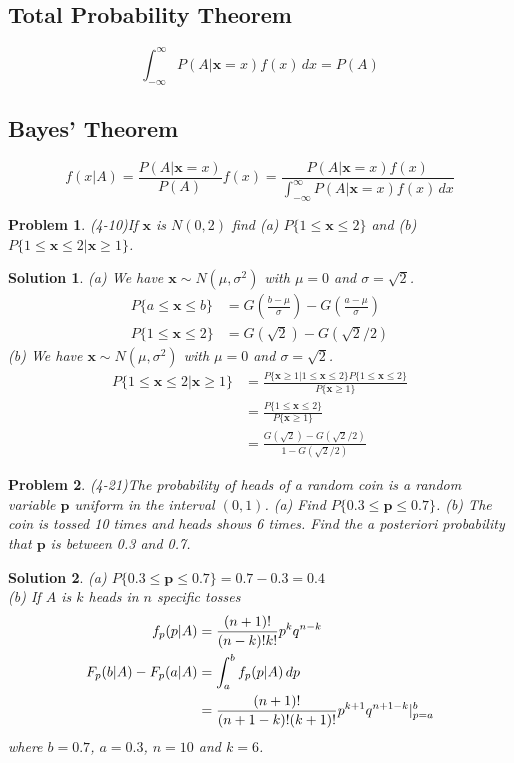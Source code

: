 \documentclass{article}
\newtheorem{problem}{Problem}[section]
\newtheorem{solution}{Solution}[section]
\begin{document}
		\subsection{Total Probability Theorem}
			\begin{equation}
				\int_{-\infty}^{\infty}{P(A|\mathbf{x}=x)f(x)\,dx}=P(A)
			\end{equation}
		\subsection{Bayes' Theorem}
			\begin{equation}
				f(x|A)=\frac{P(A|\mathbf{x}=x)}{P(A)}f(x)=\frac{P(A|\mathbf{x}=x)f(x)}{\int_{-\infty}^{\infty}{P(A|\mathbf{x}=x)f(x)\,dx}}
			\end{equation}
			\begin{problem}
				(4-10)If $\mathbf{x}$ is $N(0,2)$ find (a) $P\{1\leq\mathbf{x}\leq 2\}$ and (b) $P\{1\leq\mathbf{x}\leq 2|\mathbf{x}\geq 1\}$.
			\end{problem}
			\begin{solution}
				(a) We have $\mathbf{x}\sim N(\mu,\sigma^2)$ with $\mu=0$ and $\sigma=\sqrt{2}$.
				\begin{align*}
					P\{a\leq\mathbf{x}\leq b\}&=G\left(\frac{b-\mu}{\sigma}\right)-G\left(\frac{a-\mu}{\sigma}\right)\\
					P\{1\leq\mathbf{x}\leq 2\}&=G(\sqrt{2})-G(\sqrt{2}/2)
				\end{align*}
				(b) We have $\mathbf{x}\sim N(\mu,\sigma^2)$ with $\mu=0$ and $\sigma=\sqrt{2}$.
				\begin{align*}
					P\{1\leq\mathbf{x}\leq 2|\mathbf{x}\geq 1\}&=\frac{P\{\mathbf{x}\geq 1|1\leq\mathbf{x}\leq 2\}P\{1\leq\mathbf{x}\leq 2\}}{P\{\mathbf{x}\geq 1\}}\\
					&=\frac{P\{1\leq\mathbf{x}\leq 2\}}{P\{\mathbf{x}\geq 1\}}\\
					&=\frac{G(\sqrt{2})-G(\sqrt{2}/2)}{1-G(\sqrt{2}/2)}
				\end{align*}				
			\end{solution}
			\begin{problem}
				(4-21)The probability of \emph{heads} of a random coin is a random variable $\mathbf{p}$ uniform in the interval $(0,1)$. (a) Find $P\{0.3\leq\mathbf{p}\leq 0.7\}$. (b) The coin is tossed 10 times and heads shows 6 times. Find the a posteriori probability that $\mathbf{p}$ is between 0.3 and 0.7.
			\end{problem}
			\begin{solution}
				(a) $P\{0.3\leq\mathbf{p}\leq 0.7\}=0.7-0.3=0.4$\\
				(b) If $A$ is $k$ heads in $n$ specific tosses
				\begin{align*}
					f_p(p|A)&=\frac{(n+1)!}{(n-k)!k!}p^kq^{n-k}\\
					F_p(b|A)-F_p(a|A)&=\int_a^b{f_p(p|A)\,dp}\\
					&={\frac{(n+1)!}{(n+1-k)!(k+1)!}p^{k+1}q^{n+1-k}}\arrowvert_{p=a}^b
				\end{align*}
				where $b=0.7$, $a=0.3$, $n=10$ and $k=6$.
			\end{solution}
\end{document}
